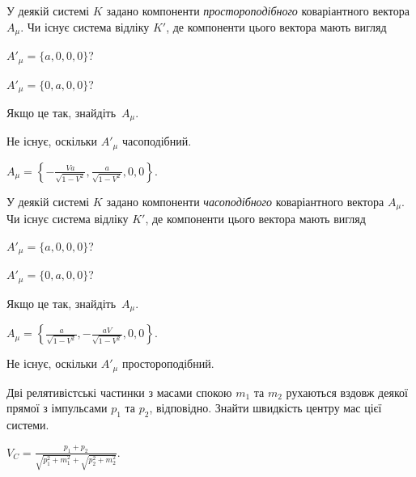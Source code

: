 \begin{problem}
У деякій системі $K$ задано компоненти \emph{простороподібного} коваріантного вектора $A_{\mu}$. Чи існує система відліку $K'$, де компоненти цього вектора мають вигляд
\begin{enumerate*}[label=\alph*)]
	\item $A'_{\mu} = \{a,0,0,0\}$?
	\item $A'_{\mu} = \{0,a,0,0\}$?
\end{enumerate*}
Якщо це так, знайдіть~$A_{\mu}$.
\begin{solution}
	\begin{enumerate*}[label=\alph*)]
		\item Не існує, оскільки $A'_{\mu}$ часоподібний.
		\item $A_{\mu} = \left\lbrace -\frac{Va}{\sqrt{1-V^2}},\frac{a}{\sqrt{1-V^2}},0,0 \right\rbrace$.
	\end{enumerate*}
\end{solution}
\end{problem}

\begin{problem}
У деякій системі $K$ задано компоненти \emph{часоподібного} коваріантного вектора $A_{\mu}$. Чи існує система відліку $K'$, де компоненти цього вектора мають вигляд
\begin{enumerate*}[label=\alph*)]
	\item $A'_{\mu} = \{a,0,0,0\}$?
	\item $A'_{\mu} = \{0,a,0,0\}$?
\end{enumerate*}
Якщо це так, знайдіть~$A_{\mu}$.
\begin{solution}
	\begin{enumerate*}[label=\alph*)]
		\item $A_{\mu} = \left\lbrace \frac{a}{\sqrt{1-V^2}},-\frac{aV}{\sqrt{1-V^2}},0,0 \right\rbrace$.
		\item Не існує, оскільки $A'_{\mu}$ простороподібний.
	\end{enumerate*}
\end{solution}
\end{problem}

\begin{problem}
Дві релятивістські частинки з масами спокою  $m_1$ та $m_2$ рухаються вздовж деякої прямої з імпульсами $p_1$ та $p_2$, відповідно. Знайти швидкість центру мас цієї системи.
\begin{solution}
	$V_C = \frac{p_1 + p_2}{\sqrt{p_1^2 + m_1^2} + \sqrt{p_2^2 + m_2^2}}$.
\end{solution}
\end{problem}

